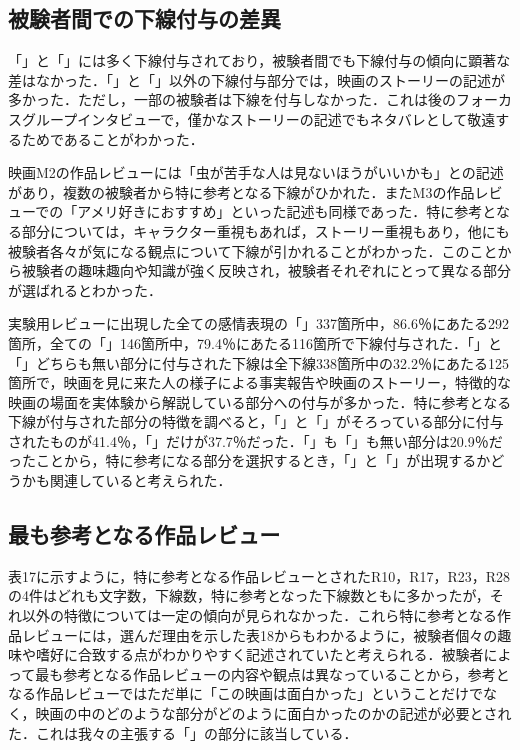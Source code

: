 \documentclass[japanese]{jnlp_1.3a}
\begin{document}
\subsection{被験者間での下線付与の差異}

「」と「」には多く下線付与されており，被験者間でも下線付与の傾向に顕著な差はなかった．「」と「」以外の下線付与部分では，映画のストーリーの記述が多かった．ただし，一部の被験者は下線を付与しなかった．これは後のフォーカスグループインタビューで，僅かなストーリーの記述でもネタバレとして敬遠するためであることがわかった．

映画M2の作品レビューには「虫が苦手な人は見ないほうがいいかも」との記述があり，複数の被験者から特に参考となる下線がひかれた．またM3の作品レビューでの「アメリ好きにおすすめ」といった記述も同様であった．特に参考となる部分については，キャラクター重視もあれば，ストーリー重視もあり，他にも被験者各々が気になる観点について下線が引かれることがわかった．このことから被験者の趣味趣向や知識が強く反映され，被験者それぞれにとって異なる部分が選ばれるとわかった．

実験用レビューに出現した全ての感情表現の「」337箇所中，86.6{\kern0pt}％にあたる292箇所，全ての「」146箇所中，79.4{\kern0pt}％にあたる116箇所で下線付与された．「」と「」どちらも無い部分に付与された下線は全下線338箇所中の32.2{\kern0pt}％にあたる125箇所で，映画を見に来た人の様子による事実報告や映画のストーリー，特徴的な映画の場面を実体験から解説している部分への付与が多かった．特に参考となる下線が付与された部分の特徴を調べると，「」と「」がそろっている部分に付与されたものが41.4{\kern0pt}％，「」だけが37.7{\kern0pt}％だった．「」も「」も無い部分は20.9{\kern0pt}％だったことから，特に参考になる部分を選択するとき，「」と「」が出現するかどうかも関連していると考えられた．

\subsection{最も参考となる作品レビュー}

表17に示すように，特に参考となる作品レビューとされたR10，R17，R23，R28の4件はどれも文字数，下線数，特に参考となった下線数ともに多かったが，それ以外の特徴については一定の傾向が見られなかった．これら特に参考となる作品レビューには，選んだ理由を示した表18からもわかるように，被験者個々の趣味や嗜好に合致する点がわかりやすく記述されていたと考えられる．被験者によって最も参考となる作品レビューの内容や観点は異なっていることから，参考となる作品レビューではただ単に「この映画は面白かった」ということだけでなく，映画の中のどのような部分がどのように面白かったのかの記述が必要とされた．これは我々の主張する「」の部分に該当している．
\end{document}

